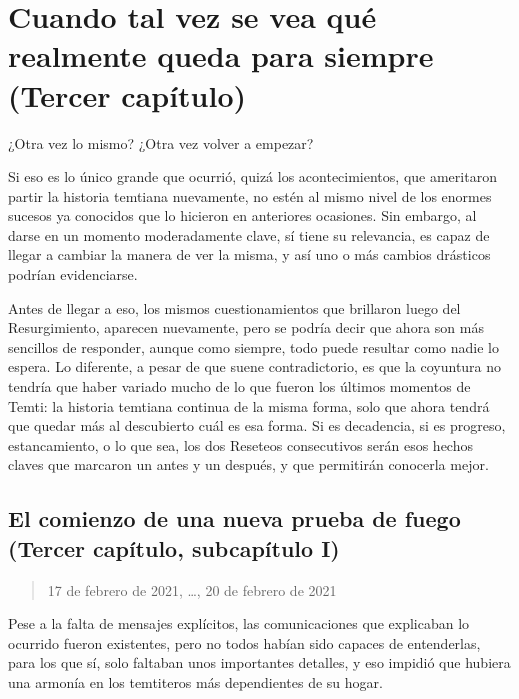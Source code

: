 \documentclass[
  spanish,
]{book}
\begin{document}
\hypertarget{cuando-tal-vez-se-vea-quuxe9-realmente-queda-para-siempre-tercer-capuxedtulo}{%
\chapter{Cuando tal vez se vea qué realmente queda para siempre (Tercer capítulo)}\label{cuando-tal-vez-se-vea-quuxe9-realmente-queda-para-siempre-tercer-capuxedtulo}}

¿Otra vez lo mismo? ¿Otra vez volver a empezar?

Si eso es lo único grande que ocurrió, quizá los acontecimientos, que ameritaron partir la historia temtiana nuevamente, no estén al mismo nivel de los enormes sucesos ya conocidos que lo hicieron en anteriores ocasiones. Sin embargo, al darse en un momento moderadamente clave, sí tiene su relevancia, es capaz de llegar a cambiar la manera de ver la misma, y así uno o más cambios drásticos podrían evidenciarse.

Antes de llegar a eso, los mismos cuestionamientos que brillaron luego del Resurgimiento, aparecen nuevamente, pero se podría decir que ahora son más sencillos de responder, aunque como siempre, todo puede resultar como nadie lo espera. Lo diferente, a pesar de que suene contradictorio, es que la coyuntura no tendría que haber variado mucho de lo que fueron los últimos momentos de Temti: la historia temtiana continua de la misma forma, solo que ahora tendrá que quedar más al descubierto cuál es esa forma. Si es decadencia, si es progreso, estancamiento, o lo que sea, los dos Reseteos consecutivos serán esos hechos claves que marcaron un antes y un después, y que permitirán conocerla mejor.

\hypertarget{el-comienzo-de-una-nueva-prueba-de-fuego-tercer-capuxedtulo-subcapuxedtulo-i}{%
\section{El comienzo de una nueva prueba de fuego (Tercer capítulo, subcapítulo I)}\label{el-comienzo-de-una-nueva-prueba-de-fuego-tercer-capuxedtulo-subcapuxedtulo-i}}

\begin{quote}
17 de febrero de 2021, \ldots, 20 de febrero de 2021
\end{quote}

Pese a la falta de mensajes explícitos, las comunicaciones que explicaban lo ocurrido fueron existentes, pero no todos habían sido capaces de entenderlas, para los que sí, solo faltaban unos importantes detalles, y eso impidió que hubiera una armonía en los temtiteros más dependientes de su hogar.
\end{document}
